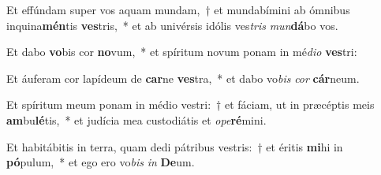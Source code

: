 \item Et effúndam super vos aquam mundam,~† et mundabímini ab ómnibus inquina\textbf{mén}tis \textbf{ves}tris,~* et ab univérsis idólis ves\textit{tris} \textit{mun}\textbf{dá}bo vos.
\item Et dabo \textbf{vo}bis cor \textbf{no}vum,~* et spíritum novum ponam in mé\textit{di}\textit{o} \textbf{ves}tri:
\item Et áuferam cor lapídeum de \textbf{car}ne \textbf{ves}tra,~* et dabo vo\textit{bis} \textit{cor} \textbf{cár}neum.
\item Et spíritum meum ponam in médio vestri:~† et fáciam, ut in præcéptis meis \textbf{am}bu\textbf{lé}tis,~* et judícia mea custodiátis et \textit{o}\textit{pe}\textbf{ré}mini.
\item Et habitábitis in terra, quam dedi pátribus vestris:~† et éritis \textbf{mi}hi in \textbf{pó}pulum,~* et ego ero vo\textit{bis} \textit{in} \textbf{De}um.
